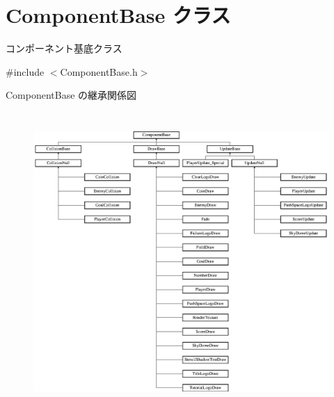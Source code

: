 \hypertarget{class_component_base}{}\section{Component\+Base クラス}
\label{class_component_base}


コンポーネント基底クラス  




{\ttfamily \#include $<$Component\+Base.\+h$>$}

Component\+Base の継承関係図\begin{figure}[H]
\begin{center}
\leavevmode
\includegraphics[height=11.367521cm]{class_component_base}
\end{center}
\end{figure}
